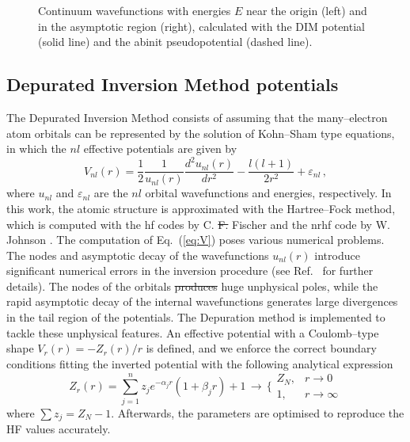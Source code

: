 \documentclass[10pt]{article}
\providecommand{\DIFaddtex}[1]{{\protect\color{blue}\uwave{#1}}} %
\providecommand{\DIFdeltex}[1]{{\protect\color{red}\sout{#1}}}                      %
\providecommand{\DIFaddbegin}{} %
\providecommand{\DIFaddend}{} %
\providecommand{\DIFdelbegin}{} %
\providecommand{\DIFdelend}{} %
\providecommand{\DIFadd}[1]{\texorpdfstring{\DIFaddtex{#1}}{#1}} %
\providecommand{\DIFdel}[1]{\texorpdfstring{\DIFdeltex{#1}}{}} %
\begin{document}
\begin{figure}[H]
 \caption{Continuum wavefunctions with energies $E$ near the origin 
 (left) and in the asymptotic region (right), calculated with the 
 DIM potential (solid line) and the {\sc abinit} pseudopotential (dashed line). }
 \label{fig:contLi}
\end{figure}

\subsection{Depurated Inversion Method potentials}
\label{sec:DIM}

The Depurated Inversion Method \cite{Mendez2015,Mendez2016,Mendez2018} 
consists of assuming that the many--electron atom orbitals can be 
represented by the solution of Kohn--Sham type equations, in which 
the $nl$ effective potentials are given by 
\begin{equation}
V_{nl}(r) = 
\frac{1}{2}\frac{1}{u_{nl}(r)}
\frac{d^2u_{nl}(r)}{dr^{2}} - 
\frac{l(l+1)}{2r^{2}}+\varepsilon_{nl} \, ,
\label{eq:V}
\end{equation}
where $u_{nl}$ and $\varepsilon_{nl}$ are the $nl$ orbital wavefunctions and
energies, respectively. In this work, the atomic structure is
approximated with the Hartree--Fock method, 
which is computed with the {\sc hf} codes by 
C. \DIFdelbegin \DIFdel{F. }\DIFdelend \DIFaddbegin \DIFadd{Froese }\DIFaddend Fischer \cite{FroeseFischer1997} and the {\sc nrhf} code by 
W. Johnson \cite{Johnson2007}. The computation of Eq.~(\ref{eq:V}) 
poses various numerical problems. The nodes and asymptotic decay
of the wavefunctions $u_{nl}(r)$ introduce significant numerical errors in
the inversion procedure (see Ref.~\cite{Mendez2018} for further 
details). The nodes of the orbitals \DIFdelbegin \DIFdel{produces }\DIFdelend \DIFaddbegin \DIFadd{produce }\DIFaddend huge unphysical 
poles, while the rapid asymptotic decay of the internal wavefunctions 
generates large divergences in the tail region of the potentials.
The Depuration method is implemented to tackle these unphysical features. 
An effective potential with a Coulomb--type shape $V_r(r)=-Z_r(r)/r$ 
is defined, and we enforce the correct boundary 
conditions fitting the inverted potential with the following analytical 
expression
\begin{equation}
 Z_r(r) = \sum_{j=1}^n z_j e^{-\alpha_j r}(1+\beta_jr) + 1
 \, \longrightarrow \, \bigg\{
 \begin{array}{cc}
  Z_N, & r\rightarrow0 \\
  1, & r\rightarrow\infty 
 \end{array}
 \label{eq:atomiczDIM}
\end{equation} 
where \mbox{$\sum z_j = Z_N-1$}. Afterwards, the parameters are 
optimised to reproduce the HF values accurately. 
\end{document}
